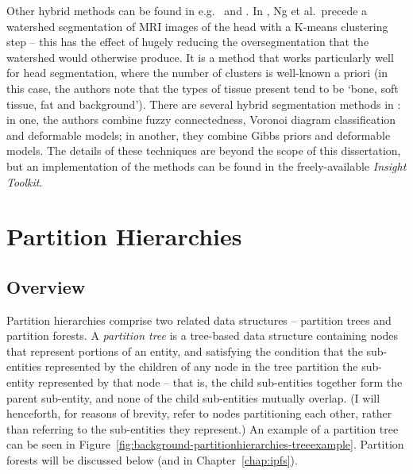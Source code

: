 Other hybrid methods can be found in e.g.~\cite{ng06} and \cite{itk}. In \cite{ng06}, Ng et al.\ precede a watershed segmentation of MRI images of the head with a K-means clustering step -- this has the effect of hugely reducing the oversegmentation that the watershed would otherwise produce. It is a method that works particularly well for head segmentation, where the number of clusters is well-known a priori (in this case, the authors note that the types of tissue present tend to be `bone, soft tissue, fat and background'). There are several hybrid segmentation methods in \cite{itk}: in one, the authors combine fuzzy connectedness, Voronoi diagram classification and deformable models; in another, they combine Gibbs priors and deformable models. The details of these techniques are beyond the scope of this dissertation, but an implementation of the methods can be found in the freely-available \emph{Insight Toolkit}.

\clearpage

\section{Partition Hierarchies}
\label{sec:background-partitionhierarchies}


\subsection{Overview}

Partition hierarchies comprise two related data structures -- partition trees and partition forests. A \emph{partition tree} is a tree-based data structure containing nodes that represent portions of an entity, and satisfying the condition that the sub-entities represented by the children of any node in the tree partition the sub-entity represented by that node -- that is, the child sub-entities together form the parent sub-entity, and none of the child sub-entities mutually overlap. (I will henceforth, for reasons of brevity, refer to nodes partitioning each other, rather than referring to the sub-entities they represent.) An example of a partition tree can be seen in Figure~\ref{fig:background-partitionhierarchies-treeexample}. Partition forests will be discussed below (and in Chapter~\ref{chap:ipfs}).


